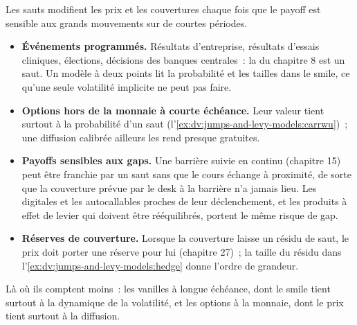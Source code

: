 Les sauts modifient les prix et les couvertures chaque fois que le payoff est sensible aux grands mouvements sur de courtes périodes.
\begin{itemize}
\item \textbf{Événements programmés.} Résultats d'entreprise, résultats d'essais cliniques, élections, décisions des banques centrales~: la 
du chapitre 8 est un saut. Un modèle à deux points lit la probabilité et les tailles dans le smile, ce qu'une seule
volatilité implicite ne peut pas faire.
\item \textbf{Options hors de la monnaie à courte échéance.} Leur valeur tient surtout à la probabilité d'un saut
(l'\cref{ex:dv:jumps-and-levy-models:carrwu})~; une diffusion calibrée ailleurs les rend presque gratuites.
\item \textbf{Payoffs sensibles aux gaps.} Une barrière suivie en continu (chapitre 15) peut être franchie par un saut
sans que le cours échange à proximité, de sorte que la couverture prévue par le desk à la barrière n'a jamais lieu. Les digitales et
les autocallables proches de leur déclenchement, et les produits à effet de levier qui doivent être rééquilibrés, portent le même risque de gap.
\item \textbf{Réserves de couverture.} Lorsque la couverture laisse un résidu de saut, le prix doit porter une réserve pour lui
(chapitre 27)~; la taille du résidu dans l'\cref{ex:dv:jumps-and-levy-models:hedge} donne l'ordre de grandeur.
\end{itemize}
Là où ils comptent moins~: les vanilles à longue échéance, dont le smile tient surtout à la dynamique de la volatilité, et les
options à la monnaie, dont le prix tient surtout à la diffusion.

